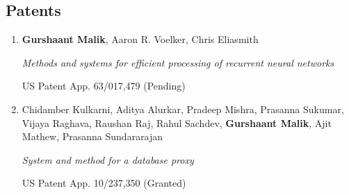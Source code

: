 \subsection{Patents}
\begin{enumerate}
	\setcounter{enumi}{\value{publicationCounter}}
	
	\item \textbf{Gurshaant Malik}, Aaron R. Voelker, Chris Eliasmith
	
	\textit{Methods and systems for efficient processing of recurrent neural networks}
	
	US Patent App. 63/017,479 (Pending)
	
	\item Chidamber Kulkarni, Aditya Alurkar, Pradeep Mishra, Prasanna Sukumar, Vijaya Raghava, Raushan Raj, Rahul Sachdev, \textbf{Gurshaant Malik}, Ajit Mathew, Prasanna Sundararajan
	
	\textit{System and method for a database proxy}
	
	US Patent App. 10/237,350 (Granted)
	
	\setcounter{publicationCounter}{\value{enumi}}	%
\end{enumerate}

